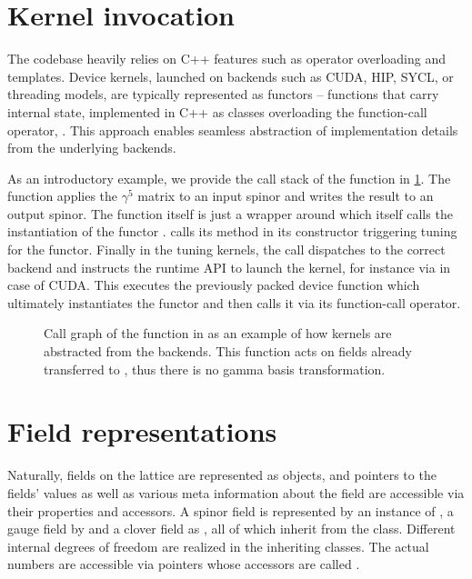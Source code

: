 \section{Kernel invocation}
\label{sec:quda:kernel:invocation}

The codebase heavily relies on C++ features such as operator overloading and templates. Device kernels, launched on backends such as CUDA, HIP, SYCL, or threading models, are typically represented as functors -- functions that carry internal state, implemented in C++ as classes overloading the function-call operator, . This approach enables seamless abstraction of implementation details from the underlying backends.

As an introductory example, we provide the call stack of the function  in \cref{fig:quda:gamma5}.
The function applies the $\gamma^5$ matrix to an input spinor and writes the result to an output spinor.
The function itself is just a wrapper around  which itself calls the instantiation of the functor .
 calls its  method in its constructor triggering tuning for the  functor.
Finally in the tuning kernels, the  call dispatches to the correct backend and instructs the runtime API to launch the kernel, for instance via  in case of CUDA.
This executes the previously packed device function which ultimately instantiates the  functor and then calls it via its function-call operator.
\begin{figure}

\caption{
Call graph of the  function in \quda as an example of how kernels are abstracted from the backends.
This function acts on fields already transferred to \quda, thus there is no gamma basis transformation.
}
\label{fig:quda:gamma5}
\end{figure}

\section{Field representations}
\label{sec:quda:fields}

Naturally, fields on the lattice are represented as objects, and pointers to the fields' values as well as various meta information about the field are accessible via their properties and accessors.
A spinor field is represented by an instance of , a gauge field by  and a clover field as , all of which inherit from the  class. Different internal degrees of freedom are realized in the inheriting classes. The actual numbers are accessible via pointers whose accessors are called .

